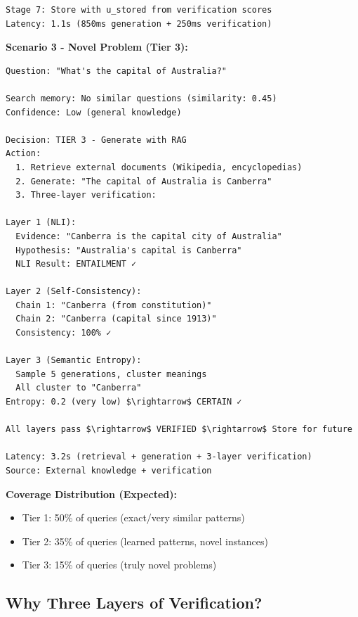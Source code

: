\documentclass[12pt,a4paper]{article}
\theoremstyle{definition}
\begin{document}
\begin{examplebox}[title=How CAEM Decides What To Do]
\begin{verbatim}
Stage 7: Store with u_stored from verification scores
Latency: 1.1s (850ms generation + 250ms verification)
\end{verbatim}

\textbf{Scenario 3 - Novel Problem (Tier 3):}
\begin{verbatim}
Question: "What's the capital of Australia?"

Search memory: No similar questions (similarity: 0.45)
Confidence: Low (general knowledge)

Decision: TIER 3 - Generate with RAG
Action: 
  1. Retrieve external documents (Wikipedia, encyclopedias)
  2. Generate: "The capital of Australia is Canberra"
  3. Three-layer verification:

Layer 1 (NLI):
  Evidence: "Canberra is the capital city of Australia"
  Hypothesis: "Australia's capital is Canberra"
  NLI Result: ENTAILMENT ✓

Layer 2 (Self-Consistency):
  Chain 1: "Canberra (from constitution)"
  Chain 2: "Canberra (capital since 1913)"
  Consistency: 100% ✓

Layer 3 (Semantic Entropy):
  Sample 5 generations, cluster meanings
  All cluster to "Canberra"
Entropy: 0.2 (very low) $\rightarrow$ CERTAIN ✓

All layers pass $\rightarrow$ VERIFIED $\rightarrow$ Store for future
  
Latency: 3.2s (retrieval + generation + 3-layer verification)
Source: External knowledge + verification
\end{verbatim}

\textbf{Coverage Distribution (Expected):}
\begin{itemize}
    \item Tier 1: 50\% of queries (exact/very similar patterns)
    \item Tier 2: 35\% of queries (learned patterns, novel instances)
    \item Tier 3: 15\% of queries (truly novel problems)
\end{itemize}
\end{examplebox}

\subsection{Why Three Layers of Verification?}
\end{document}
